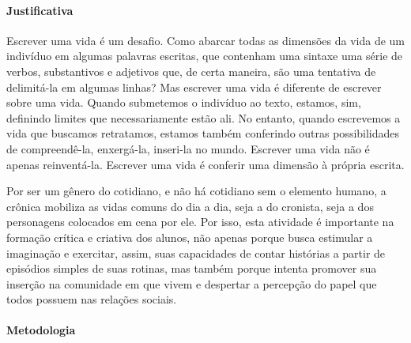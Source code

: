 \documentclass[12pt]{extarticle}
\begin{document}
\paragraph{Justificativa} Escrever uma vida é um desafio. Como abarcar
todas as dimensões da vida de um indivíduo em algumas palavras escritas,
que contenham uma sintaxe uma série de verbos, substantivos e adjetivos
que, de certa maneira, são uma tentativa de delimitá-la em algumas
linhas? Mas escrever uma vida é diferente de escrever sobre uma vida.
Quando submetemos o indivíduo ao texto, estamos, sim, definindo limites
que necessariamente estão ali. No entanto, quando escrevemos a vida que
buscamos retratamos, estamos também conferindo outras possibilidades de
compreendê-la, enxergá-la, inseri-la no mundo. Escrever uma vida não é
apenas reinventá-la. Escrever uma vida é conferir uma dimensão à própria
escrita.

Por ser um gênero do cotidiano, e não há cotidiano sem o elemento
humano, a crônica mobiliza as vidas comuns do dia a dia, seja a do
cronista, seja a dos personagens colocados em cena por ele. Por isso,
esta atividade é importante na formação crítica e criativa dos alunos,
não apenas porque busca estimular a imaginação e exercitar, assim, suas
capacidades de contar histórias a partir de episódios simples de suas
rotinas, mas também porque intenta promover sua inserção na comunidade
em que vivem e despertar a percepção do papel que todos possuem nas
relações sociais.

\paragraph{Metodologia} 
\end{document}
